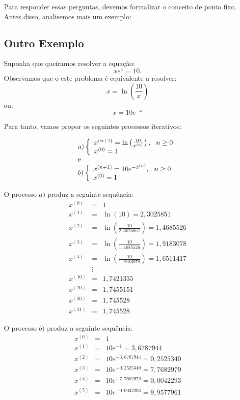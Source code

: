 \documentclass[main.tex]{subfiles}
\begin{document}
Para responder essas perguntas, devemos formalizar o conceito de ponto fixo. Antes disso, analisemos mais um exemplo:

\subsection{Outro Exemplo}

Suponha que queiramos resolver a equação:
$$xe^x=10.$$
Observamos que o este problema é equivalente a resolver:
\begin{equation*}
x=\ln\left(\frac{10}{x}\right)  
\end{equation*}
ou:
\begin{equation*}
x=10e^{-x}
\end{equation*}

Para tanto, vamos propor os seguintes processos iterativos:

$$\begin{array}{l}
a)\left\{\begin{array}{ll}x^{(n+1)}=\ln\left(\frac{10}{x^{(n)}}\right),~~ n\geq 0\\
x^{(0)}=1
\end{array}\right.\\ \hbox{e} \\
b)\left\{\begin{array}{ll}x^{(n+1)}={10}{e^{-x^{(n)}}},~~ n\geq 0\\
x^{(0)}=1
\end{array}\right.\end{array}$$

O processo $a)$ produz a seguinte sequência:
\begin{eqnarray*}
x^{(0)}&=&1\\
x^{(1)}&=&\ln\left({10}\right)=2,3025851\\
x^{(2)}&=&\ln\left(\frac{10}{2,3025851}\right)=1,4685526\\
x^{(3)}&=&\ln\left(\frac{10}{1,4685526}\right)=1,9183078 \\
x^{(4)}&=&\ln\left(\frac{10}{1,9183078}\right)=1,6511417  \\
&\vdots&\\
x^{(10)}&=&1,7421335 \\
x^{(20)}&=& 1,7455151\\
x^{(30)}&=& 1,745528\\
x^{(31)}&=& 1,745528
\end{eqnarray*}

O processo $b)$ produz a seguinte sequência:
\begin{eqnarray*}
x^{(0)}&=&1\\
x^{(1)}&=&10e^{-1}= 3,6787944   \\
x^{(2)}&=&10e^{- 3,6787944 }= 0,2525340     \\
x^{(3)}&=&10e^{-0,2525340}=  7,7682979      \\
x^{(4)}&=&10e^{-7,7682979}=  0,0042293      \\
x^{(5)}&=&10e^{-0,0042293}=  9,9577961
\end{eqnarray*}
\end{document}
